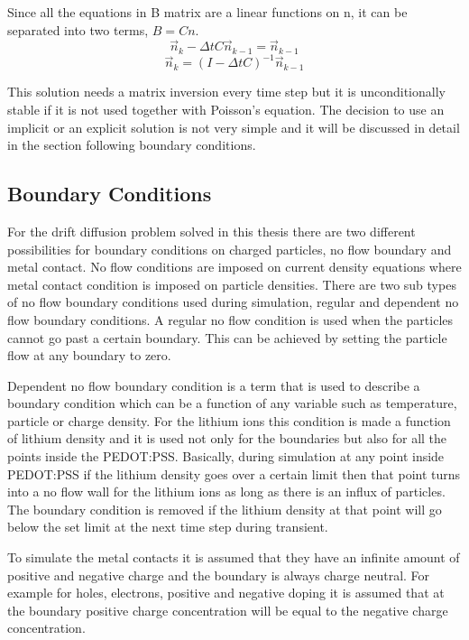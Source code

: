 \begin{doublespace}
Since all the equations in B matrix are a linear functions on n, it can be separated into two terms, $B=Cn$.
\begin{equation}\nonumber
\vec{n}_{k}-\Delta t C\vec{n}_{k-1} =\vec{n}_{k-1}
\end{equation}
\begin{equation}
\vec{n}_k=(I-\Delta t C)^{-1}\vec{n}_{k-1}
\end{equation}

This solution needs a matrix inversion every time step but it is unconditionally stable if it is not used together with Poisson's equation. The decision to use an implicit or an explicit solution is not very simple and it will be discussed in detail in the section following boundary conditions.
\clearpage


\subsection{Boundary Conditions}

For the drift diffusion problem solved in this thesis there are two different possibilities for boundary conditions on charged particles, no flow boundary and metal contact. No flow conditions are imposed on current density equations where metal contact condition is imposed on particle densities. There are two sub types of no flow boundary conditions used during simulation, regular and dependent no flow boundary conditions. A regular no flow condition is used when the particles cannot go past a certain boundary. This can be achieved by setting the particle flow at any boundary to zero. 

Dependent no flow boundary condition is a term that is used to describe a boundary condition which can be a function of any variable such as temperature, particle or charge density. For the lithium ions this condition is made a function of lithium density and it is used not only for the boundaries but also for all the points inside the PEDOT:PSS. Basically, during simulation at any point inside PEDOT:PSS if the lithium density goes over a certain limit then that point turns into a no flow wall for the lithium ions as long as there is an influx of particles. The boundary condition is removed if the lithium density at that point will go below the set limit at the next time step during transient.  

To simulate the metal contacts it is assumed that they have an infinite amount of positive and negative charge and the boundary is always charge neutral. For example for holes, electrons, positive and negative doping it is assumed that at the boundary positive charge concentration will be equal to the negative charge concentration. 


\end{doublespace}
